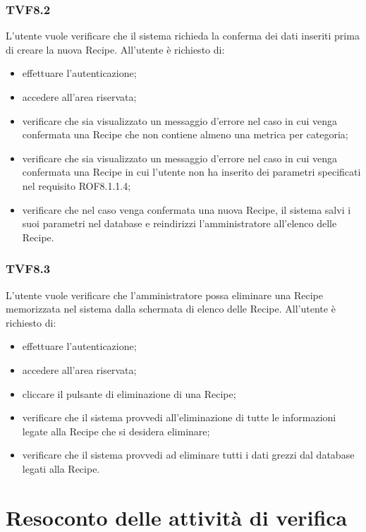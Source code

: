 		\subsubsection{TVF8.2}
			L'utente vuole verificare che il sistema richieda la conferma dei dati inseriti prima di creare la nuova Recipe. All'utente è richiesto di:
			\begin{itemize}
				\item effettuare l'autenticazione;
				\item accedere all'area riservata;
				\item verificare che sia visualizzato un messaggio d'errore nel caso in cui venga confermata una Recipe che non contiene almeno una metrica per categoria;
				\item verificare che sia visualizzato un messaggio d'errore nel caso in cui venga confermata una Recipe in cui l'utente non ha inserito dei parametri specificati nel requisito ROF8.1.1.4;
				\item verificare che nel caso venga confermata una nuova Recipe, il sistema salvi i suoi parametri nel database e reindirizzi l'amministratore all'elenco delle Recipe.
			\end{itemize}
			
		\subsubsection{TVF8.3}
			L'utente vuole verificare che l'amministratore possa eliminare una Recipe memorizzata nel sistema dalla schermata di elenco delle Recipe. All'utente è richiesto di:
			\begin{itemize}
				\item effettuare l'autenticazione;
				\item accedere all'area riservata;
				\item cliccare il pulsante di eliminazione di una Recipe;
				\item verificare che il sistema provvedi all'eliminazione di tutte le informazioni legate alla Recipe che si desidera eliminare;
				\item verificare che il sistema provvedi ad eliminare tutti i dati grezzi dal database legati alla Recipe.
			\end{itemize}
			
\pagebreak


\section{Resoconto delle attività di verifica}
